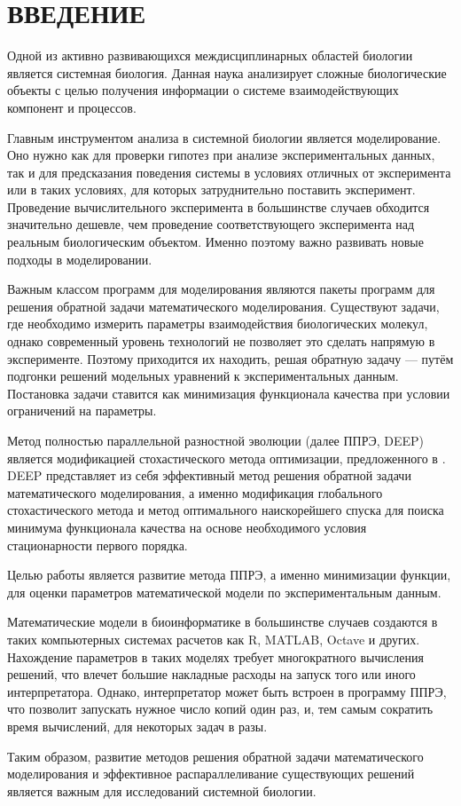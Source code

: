 \chapter*{ВВЕДЕНИЕ}

Одной из активно развивающихся междисциплинарных областей биологии является системная биология. 
Данная наука анализирует сложные биологические объекты с целью получения информации о системе взаимодействующих компонент и процессов.

Главным инструментом анализа в системной биологии является моделирование.
Оно нужно как для проверки гипотез при анализе экспериментальных данных, так и для предсказания поведения системы в условиях отличных от эксперимента или в таких условиях, для которых затруднительно поставить эксперимент.
Проведение вычислительного эксперимента в большинстве случаев обходится значительно дешевле, чем проведение соответствующего эксперимента над реальным биологическим объектом.
Именно поэтому важно развивать новые подходы в моделировании.

Важным классом программ для моделирования являются пакеты программ для решения обратной задачи математического моделирования.
Существуют задачи, где необходимо измерить параметры взаимодействия биологических молекул, однако современный уровень технологий не позволяет это сделать напрямую в эксперименте.
Поэтому приходится их находить, решая обратную задачу --- путём подгонки решений модельных уравнений к экспериментальных данным.
Постановка задачи ставится как минимизация функционала качества при условии ограничений на параметры.

Метод полностью параллельной разностной эволюции (далее ППРЭ, DEEP) \cite{Kozlov11, Kozlov13} является модификацией стохастического метода оптимизации, предложенного в \cite{Storn95}.
DEEP представляет из себя эффективный метод решения обратной задачи математического моделирования, а именно модификация глобального стохастического метода и метод оптимального наискорейшего спуска для поиска минимума функционала качества на основе необходимого условия стационарности первого порядка.

Целью работы является развитие метода ППРЭ, а именно минимизации функции, для оценки параметров математической модели по экспериментальным данным.

Математические модели в биоинформатике в большинстве случаев создаются в таких компьютерных системах расчетов как R, MATLAB, Octave и других.
Нахождение параметров в таких моделях требует многократного вычисления решений, что влечет большие накладные расходы на запуск того или иного интерпретатора.
Однако, интерпретатор может быть встроен в программу ППРЭ, что позволит запускать нужное число копий один раз, и, тем самым сократить время вычислений, для некоторых задач в разы.

Таким образом, развитие методов решения обратной задачи математического моделирования и эффективное распараллеливание существующих решений является важным для исследований системной биологии.

